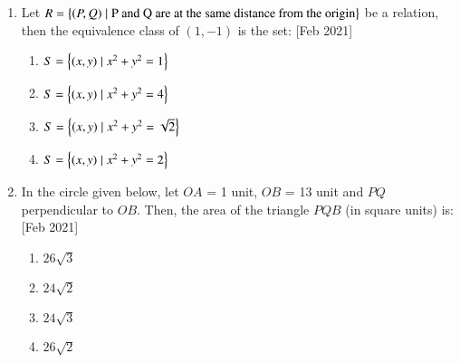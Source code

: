 \documentclass[journal]{IEEEtran}
\begin{document}
\begin{enumerate}
    \item Let $R = \left\{(P,Q) \mid \text{P and Q are at the same distance from the origin}\right\}$
    be a relation, then the equivalence class of $(1,-1)$ is the set:
    \hfill{[Feb 2021]}

    \begin{multicols}{2}
    \begin{enumerate}
        \item $S = \left\{(x, y) \mid x^2 + y^2 = 1\right\}$
        \item $S = \left\{(x, y) \mid x^2 + y^2 = 4\right\}$
        \item $S = \left\{(x, y) \mid x^2 + y^2 = \sqrt{2}\right\}$
        \item $S = \left\{(x, y) \mid x^2 + y^2 = 2\right\}$
    \end{enumerate}
    \end{multicols}

    \item In the circle given below, let $OA$ = 1 unit,
    $OB$ = 13 unit and $PQ$ perpendicular to $OB$. Then, the area
    of the triangle $PQB$ (in square units) is:
    \hfill{[Feb 2021]}

    \begin{center}
    \end{center} 


    \begin{multicols}{4}
    \begin{enumerate}
        \item $26 \sqrt{3}$
        \item $24 \sqrt{2}$
        \item $24 \sqrt{3}$
        \item $26 \sqrt{2}$
    \end{enumerate}
    \end{multicols}
\end{enumerate}
\end{document}
